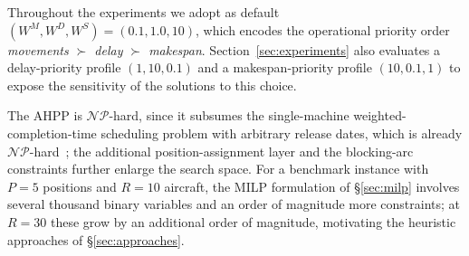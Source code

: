 Throughout the experiments we adopt as default
$(W^M, W^D, W^S) = (0.1, 1.0, 10)$, which encodes the operational
priority order \emph{movements $\succ$ delay $\succ$ makespan}.
Section~\ref{sec:experiments} also evaluates a delay-priority profile
$(1, 10, 0.1)$ and a makespan-priority profile $(10, 0.1, 1)$ to expose
the sensitivity of the solutions to this choice.

The AHPP is $\mathcal{NP}$-hard, since it subsumes the single-machine
weighted-completion-time scheduling problem with arbitrary release dates,
which is already $\mathcal{NP}$-hard~\citep{Lenstra1977}; the additional
position-assignment layer and the blocking-arc constraints further enlarge
the search space.  For a benchmark instance with $P = 5$ positions and
$R = 10$ aircraft, the MILP formulation of \S\ref{sec:milp} involves
several thousand binary variables and an order of magnitude more
constraints; at $R = 30$ these grow by an additional order of magnitude,
motivating the heuristic approaches of \S\ref{sec:approaches}.
